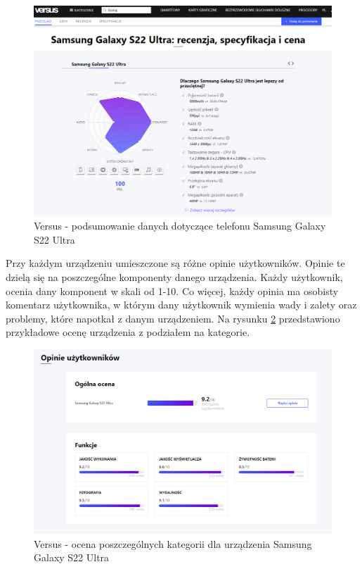 \begin{figure}[h]
    \centering
    \includegraphics[width=15cm]{img/versus/versusDetails.png}
    \caption{Versus - podsumowanie danych dotyczące telefonu Samsung Galaxy S22 Ultra}
    \label{versus_2}
\end{figure}
Przy każdym urządzeniu umieszczone są różne opinie użytkowników. Opinie te dzielą się na poszczególne komponenty danego urządzenia. Każdy użytkownik, ocenia dany komponent w skali od 1-10. Co więcej, każdy opinia ma osobisty komentarz użytkownika, w którym dany użytkownik wymienia wady i zalety oraz problemy, które napotkał z danym urządzeniem.
Na rysunku \ref*{versus_3} przedstawiono przykładowe ocenę urządzenia z podziałem na kategorie.
\begin{figure}[H]
    \centering
    \includegraphics[width=15cm]{img/versus/versusOpinie.png}
    \caption{Versus - ocena poszczególnych kategorii dla urządzenia Samsung Galaxy S22 Ultra}
    \label{versus_3}
\end{figure}
